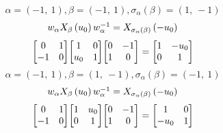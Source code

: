 \documentclass[11pt]{article}
\theoremstyle{definition}
\begin{document}
\providecommand{\scaletoalign}[2]{%
  \sbox0{$#2$}%
  \ifdim\wd0>#1\relax 
    \resizebox{#1}{!}{\usebox0}%
  \else 
    \usebox0%
  \fi 
}
\[
\alpha = \left( -1, \  1\right), \beta = \left( -1, \  1\right), \sigma_{\alpha}(\beta) = \left( 1, \  -1\right)
\]
\[
\scaletoalign{\textwidth}{w_{\alpha} X_{\beta}\left(u_{0}\right) w_{\alpha}^{-1} = X_{\sigma_{\alpha}\left(\beta\right)}\left(- u_{0}\right)}
\]
\[
\scaletoalign{\textwidth}{{\left[\begin{matrix}0 & 1\\-1 & 0\end{matrix}\right]} {\left[\begin{matrix}1 & 0\\u_{0} & 1\end{matrix}\right]} {\left[\begin{matrix}0 & -1\\1 & 0\end{matrix}\right]} = {\left[\begin{matrix}1 & - u_{0}\\0 & 1\end{matrix}\right]}}
\]
\[
\alpha = \left( -1, \  1\right), \beta = \left( 1, \  -1\right), \sigma_{\alpha}(\beta) = \left( -1, \  1\right)
\]
\[
\scaletoalign{\textwidth}{w_{\alpha} X_{\beta}\left(u_{0}\right) w_{\alpha}^{-1} = X_{\sigma_{\alpha}\left(\beta\right)}\left(- u_{0}\right)}
\]
\[
\scaletoalign{\textwidth}{{\left[\begin{matrix}0 & 1\\-1 & 0\end{matrix}\right]} {\left[\begin{matrix}1 & u_{0}\\0 & 1\end{matrix}\right]} {\left[\begin{matrix}0 & -1\\1 & 0\end{matrix}\right]} = {\left[\begin{matrix}1 & 0\\- u_{0} & 1\end{matrix}\right]}}
\]
\end{document}
